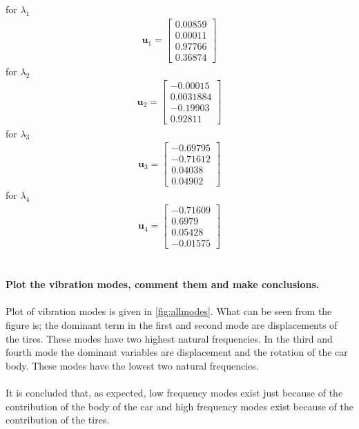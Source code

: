 \documentclass[]{report}
\begin{document}
for $\lambda_1$
\begin{eqnarray*}
\mathbf{u}_1=\left[\begin{array}{cccc} 0.00859  \\ 0.00011  \\ 0.97766  \\ 0.36874 \end{array}\right]
\end{eqnarray*}
for $\lambda_2$
\begin{eqnarray*}
\mathbf{u}_2=\left[\begin{array}{cccc} -0.00015  \\ 0.0031884  \\ -0.19903  \\ 0.92811 \end{array}\right]
\end{eqnarray*}
for $\lambda_3$
\begin{eqnarray*}
\mathbf{u}_3=\left[\begin{array}{cccc} -0.69795  \\ -0.71612 \\ 0.04038  \\ 0.04902\end{array}\right]
\end{eqnarray*}
for $\lambda_4$
\begin{eqnarray*}
\mathbf{u}_4=\left[\begin{array}{cccc} -0.71609 \\ 0.6979  \\ 0.05428  \\ -0.01575 \end{array}\right]
\end{eqnarray*}
\\~\\
\textbf{Plot the vibration modes, comment them and make conclusions.}
\\~\\
Plot of vibration modes is given in \cref{fig:allmodes}. What can be seen from the figure is; the dominant term in the first and second mode are displacements of the tires. These modes have two highest natural frequencies. In the third and fourth mode the dominant variables are displacement and the rotation of the car body. These modes have the lowest two natural frequencies.
\\~\\
It is concluded that, as expected, low frequency modes exist just because of the contribution of the body of the car and high frequency modes exist because of the contribution of the tires.
\end{document}
